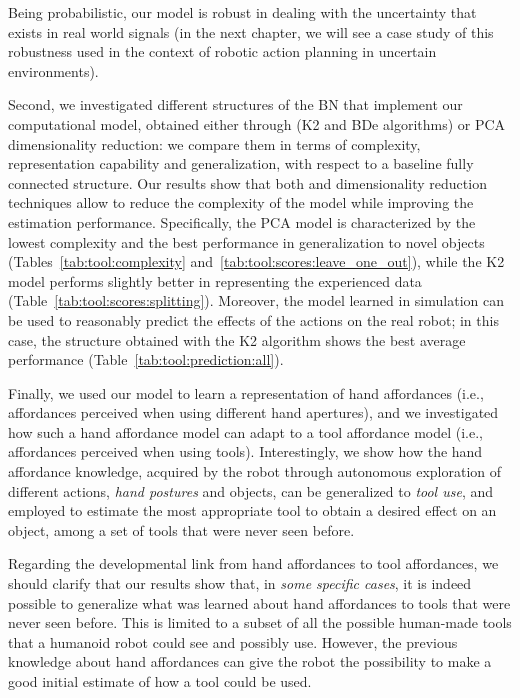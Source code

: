 Being probabilistic, our model is robust in dealing with the uncertainty that exists in real world signals (in the next chapter, we will see a case study of this robustness used in the context of robotic action planning in uncertain environments).

Second, we investigated different structures of the \ac{BN} that implement our computational model, obtained either through \StructureLearning{} (K2 and BDe algorithms) or \ac{PCA} dimensionality reduction: we compare them in terms of complexity, representation capability and generalization, with respect to a baseline fully connected structure.
Our results show that both \StructureLearning{} and dimensionality reduction techniques allow to reduce the complexity of the model while improving the estimation performance.
Specifically, the \ac{PCA} model is characterized by the lowest complexity and the best performance in generalization to novel objects (Tables~\ref{tab:tool:complexity} and~\ref{tab:tool:scores:leave_one_out}), while the K2 model performs slightly better in representing the experienced data (Table~\ref{tab:tool:scores:splitting}).
Moreover, the model learned in simulation can be used to reasonably predict the effects of the actions on the real robot; in this case, the structure obtained with the K2 algorithm shows the best average performance (Table~\ref{tab:tool:prediction:all}).

Finally, we used our model to learn a representation of hand affordances (i.e., affordances perceived when using different hand apertures), and we investigated how such a hand affordance model can adapt to a tool affordance model (i.e., affordances perceived when using tools).
Interestingly, we show how the hand affordance knowledge, acquired by the robot through autonomous exploration of different actions, \emph{hand postures} and objects, can be generalized to \emph{tool use}, and employed to estimate the most appropriate tool to obtain a desired effect on an object, among a set of tools that were never seen before.

Regarding the developmental link from hand affordances to tool affordances, we should clarify that our results show that, in \emph{some specific cases}, it is indeed possible to generalize what was learned about hand affordances to tools that were never seen before.
This is limited to a subset of all the possible human-made tools that a humanoid robot could see and possibly use.
However, the previous knowledge about hand affordances can give the robot the possibility to make a good initial estimate of how a tool could be used.

